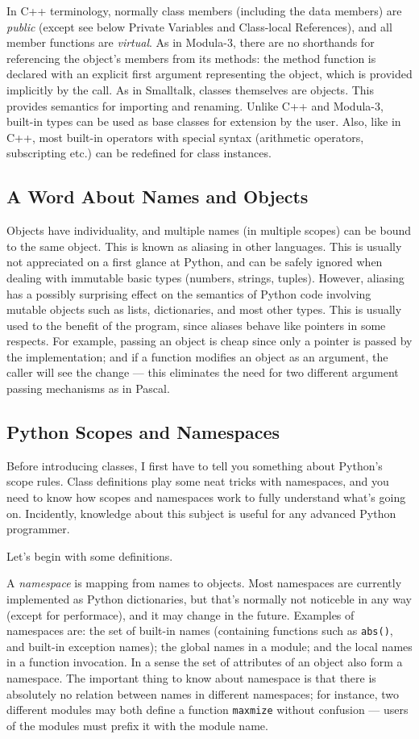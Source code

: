 \documentclass[UTF8]{article}
\begin{document}
In C++ terminology, normally class members (including the data members) are \emph{public} (except
see below Private Variables and Class-local References), and all member functions are
\emph{virtual}. As in Modula-3, there are no shorthands for referencing the object's members from
its methods: the method function is declared with an explicit first argument representing the
object, which is provided implicitly by the call. As in Smalltalk, classes themselves are objects.
This provides semantics for importing and renaming. Unlike C++ and Modula-3, built-in types can be
used as base classes for extension by the user. Also, like in C++, most built-in operators with
special syntax (arithmetic operators, subscripting etc.) can be redefined for class instances.

\subsection{A Word About Names and Objects}
Objects have individuality, and multiple names (in multiple scopes) can be bound to the same object.
This is known as aliasing in other languages. This is usually not appreciated on a first glance at
Python, and can be safely ignored when dealing with immutable basic types (numbers, strings,
tuples). However, aliasing has a possibly surprising effect on the semantics of Python code
involving mutable objects such as lists, dictionaries, and most other types. This is usually used
to the benefit of the program, since aliases behave like pointers in some respects. For example,
passing an object is cheap since only a pointer is passed by the implementation; and if a function
modifies an object as an argument, the caller will see the change --- this eliminates the need for
two different argument passing mechanisms as in Pascal.

\subsection{Python Scopes and Namespaces}
Before introducing classes, I first have to tell you something about Python's scope rules. Class
definitions play some neat tricks with namespaces, and you need to know how scopes and namespaces
work to fully understand what's going on. Incidently, knowledge about this subject is useful for
any advanced Python programmer.

Let's begin with some definitions.

A \emph{namespace} is mapping from names to objects. Most namespaces are currently implemented as
Python dictionaries, but that's normally not noticeble in any way (except for performace), and it
may change in the future. Examples of namespaces are: the set of built-in names (containing
functions such as \texttt{abs()}, and built-in exception names); the global names in a module; and
the local names in a function invocation. In a sense the set of attributes of an object also form a
namespace. The important thing to know about namespace is that there is absolutely no relation
between names in different namespaces; for instance, two different modules may both define a
function \texttt{maxmize} without confusion --- users of the modules must prefix it with the module
name.
\end{document}
